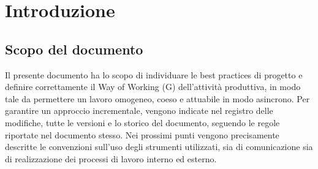 \documentclass{article}
\begin{document}
\section{Introduzione}

\subsection{Scopo del documento}
Il presente documento ha lo scopo di individuare le best practices di progetto e definire correttamente il Way of Working (G) dell'attività produttiva, in modo tale da permettere un lavoro omogeneo, coeso e attuabile in modo asincrono. Per garantire un approccio incrementale, vengono indicate nel registro delle modifiche, tutte le versioni e lo storico del documento, seguendo le regole riportate nel documento stesso. Nei prossimi punti vengono precisamente descritte le convenzioni sull'uso degli strumenti utilizzati, sia di comunicazione sia di realizzazione dei processi di lavoro interno ed esterno.
\end{document}
